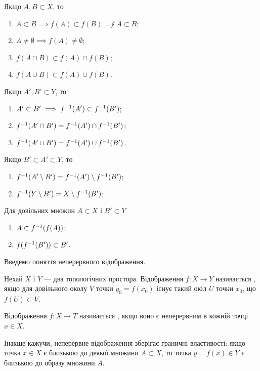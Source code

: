 Якщо $A, B \subset X$, то
\begin{enumerate}
\item $A \subset B \implies f(A) \subset f(B) \not\implies A \subset B$;
\item $A \ne \emptyset \implies f(A) \ne \emptyset$;
\item $f(A \cap B) \subset f(A) \cap f(B)$;
\item $f(A \cup B) \subset f(A) \cup f(B)$.
\end{enumerate}
Якщо $A', B' \subset Y$, то
\begin{enumerate}
\item $A' \subset B' \implies f^{-1}(A') \subset f^{-1}(B')$;
\item $f^{-1}(A' \cap B') = f^{-1}(A') \cap f^{-1}(B')$;
\item $f^{-1}(A' \cup B') = f^{-1}(A') \cup f^{-1}(B')$.
\end{enumerate}
Якщо $B' \subset A' \subset Y$, то
\begin{enumerate}
\item $f^{-1}(A' \setminus B') = f^{-1}(A') \setminus f^{-1}(B')$;
\item $f^{-1}(Y \setminus B') = X \setminus f^{-1}(B')$;
\end{enumerate}
Для довільних множин $A \subset X$ і $B' \subset Y$
\begin{enumerate}
\item $A \subset f^{-1}(f(A))$;
\item $f(f^{-1}(B')) \subset B'$.
\end{enumerate}

Введемо поняття неперервного відображення.

\begin{definition}
Нехай $X$ і $Y$ --- два топологічних простора.
Відображення $f: X \to Y$ називається , якщо для довільного околу $V$ точки $y_0 = f(x_0)$
існує такий окіл $U$ точки $x_0$, що $f(U) \subset V$.
\end{definition}

\begin{definition}
Відображення $f: X \to T$ називається ,
якщо воно є неперервним в кожній точці $x \in X$.
\end{definition}

Інакше кажучи, неперервне відображення зберігає
граничні властивості: якщо точка $x \in X$ є близькою до
деякої множини $A \subset X$, то точка $y = f(x) \in Y$ є близькою
до образу множини $A$.

